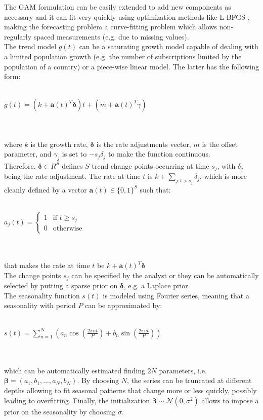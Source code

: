 \documentclass[a4paper]{article} %
\begin{document}
	The GAM formulation can be easily extended to add new components as necessary and it can fit very quickly using optimization methods like L-BFGS \cite{L-BFGS}, making the forecasting problem a curve-fitting problem which allows non-regularly spaced measurements (e.g. due to missing values).\\
	The trend model $g(t)$ can be a saturating growth model capable of dealing with a limited population growth (e.g. the number of subscriptions limited by the population of a country) or a piece-wise linear model.
	The latter has the following form:\\\\
	\centerline{
		$g(t) = (k+\pmb{a}(t)^T\pmb{\delta})t + (m + \pmb{a}(t)^T\gamma)$
	}\\\\
	where $k$ is the growth rate, $\pmb{\delta}$ is the rate adjustments vector, $m$ is the offset parameter, and $\gamma_j$ is set to $-s_j\delta_j$ to make the function continuous.\\
	Therefore, $\pmb{\delta} \in \!R^S$ defines $S$ trend change points occurring at time $s_j$, with $\delta_j$ being the rate adjustment. The rate at time $t$ is $k+\sum_{j:t>s_j}\delta_j$, which is more cleanly defined by a vector $\pmb{a}(t) \in \{0,1\}^S$ such that:\\\\
	\centerline{
		$
		a_j(t) =
		\begin{cases}
			1 & \text{if $t \geq s_j$}\\
			0 & \text{otherwise}
		\end{cases}       
		$
	}\\\\
	that makes the rate at time $t$ be $k + \pmb{a}(t)^T\pmb{\delta}$\\
	The change points $s_j$  can be specified by the analyst or they can be automatically selected by putting a sparse prior on $\pmb{\delta}$, e.g. a Laplace prior.\\
	The seasonality function $s(t)$ is modeled using Fourier series, meaning that a seasonality with period $P$ can be approximated by:\\\\
	\centerline{$s(t) = \sum_{n=1}^{N} (a_n \cos{(\frac{2\pi nt}{P})} + b_n \sin{(\frac{2\pi nt}{P})}) $}\\\\
	which can be automatically estimated finding $2N$ parameters, i.e.\\ $ \pmb{\beta} =  (a_1, b_1, ..., a_N, b_N)$. By choosing $N$, the series can be truncated at different depths allowing to fit seasonal patterns that change more or less quickly, possibly leading to overfitting. Finally, the initialization $\pmb{\beta} \sim \mathcal{N}(0, \sigma^2)$ allows to impose a prior on the seasonality by choosing $\sigma$. \\
\end{document}
